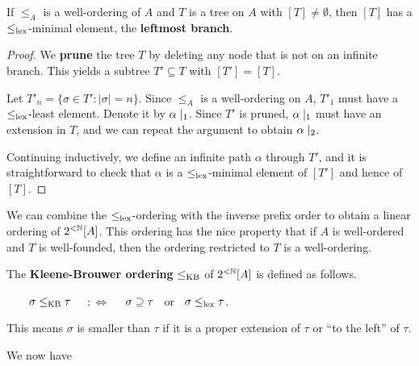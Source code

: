 \begin{proposition}\label{prop-leftmost-branch}If $\leq_A$ is a well-ordering of $A$ and $T$ is a tree on $A$ with $[T] \neq \emptyset$, then $[T]$ has a $\leq_{\operatorname{lex}}$-minimal element, the \textbf{leftmost branch}.

\end{proposition}\begin{proof}We \textbf{prune} the tree $T$ by deleting any node that is not on an infinite branch. This yields a subtree $T' \subseteq T$ with $[T'] = [T]$.

Let $T'_n = \{\sigma \in T' \colon |\sigma| = n \}$. Since $\leq_A$ is a well-ordering on $A$, $T'_1$ must have a $\leq_{\operatorname{lex}}$-least element. Denote it by $\alpha\mid_{1}$. Since $T'$ is pruned, $\alpha\mid_{1}$ must have an extension in $T$, and we can repeat the argument to obtain $\alpha\mid_{2}$.

Continuing inductively, we define an infinite path $\alpha$ through $T'$, and it is straightforward to check that $\alpha$ is a  $\leq_{\operatorname{lex}}$-minimal element of $[T']$ and hence of $[T]$.

\end{proof}We can combine the $\leq_{\operatorname{lex}}$-ordering with the inverse prefix order to obtain a linear ordering of $2^{<\mathbb{N}}[A]$. This ordering has the nice property that if $A$ is well-ordered and $T$ is well-founded, then the ordering restricted to $T$ is a well-ordering.

\begin{definition}\label{def-kleene-brouwer}The \textbf{Kleene-Brouwer ordering} $\leq_{\operatorname{KB}}$ of $2^{<\mathbb{N}}[A]$ is defined as follows.

$\qquad \sigma \leq_{\operatorname{KB}} \tau$ $\quad :\Leftrightarrow \quad$  $\sigma \supseteq \tau \;\;$  or $\; \; \sigma \leq_{\operatorname{lex}} \tau$.

\end{definition}This means $\sigma$ is smaller than $\tau$ if it is a proper extension of $\tau$ or ``to the left'' of $\tau$.

We now have

